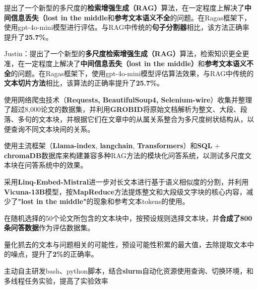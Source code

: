 \documentclass{resume}
\begin{document}
\begin{itemize}
\item{提出了一个新型的多尺度的\textbf{检索增强生成（RAG）}算法，在一定程度上解决了\textbf{中间信息丢失（lost in the middle}和\textbf{参考文本语义不全}的问题。在Ragas框架下，使用gpt-4o-mini模型进行评估。与RAG中传统的\textbf{句子分割器}相比，该方法正确率提升了\textbf{25.7\%}。}
\item{Justin：提出了一个新型的\textbf{多尺度检索增强生成（RAG）}算法，检索知识更全更准，在一定程度上解决了\textbf{中间信息丢失（lost in the middle）}和\textbf{参考文本语义不全}的问题。在Ragas框架下，使用gpt-4o-mini模型评估算法效果，与RAG中传统的\textbf{文本切片方法}相比，该算法的正确率提升了\textbf{25.7\%}。}
\item{使用网络爬虫技术（\textbf{Requests, BeautifulSoup4, Selenium-wire}）收集并整理了超过8,000论文的数据集，并利用\textbf{GROBID}将原始文档解析为整文、大段、段落、多句的文本块，并根据它们在文章中的从属关系整合为多尺度树状结构从，以便查询不同文本块间的关系。
\item 使用主流框架（\textbf{Llama-index}, \textbf{langchain}, \textbf{Transformers}）和\textbf{SQL} + \textbf{chromaDB}数据库来构建兼容多种RAG方法的模块化问答系统，以测试多尺度文本块在问答系统中的效果。}
\item{采用\textbf{Linq-Embed-Mistral}进一步对长文本进行基于语义相似度的分割，并利用\textbf{Vicuna-13B}模型，按\textbf{MapReduce}方法提炼整文和大段级文字块的核心内容，减少了\textbf{"lost in the middle"}的现象和参考文本tokens的使用。}
\item{在随机选择的50个论文所包含的文本块中，按预设规则选择文本块，并\textbf{合成了800条问答数据}作为评估数据集。}
\item{量化抓去的文本与问题相关的可能性，预设可能性积累的最大值，去除提取文本中的噪点，提升了\textbf{2\%}的正确率。}
\item{主动自主研发bash、python脚本，结合\textbf{slurm}自动化资源使用查询、切换环境，和多线程任务实验，提高了实验效率}
\end{itemize}
\end{document}
